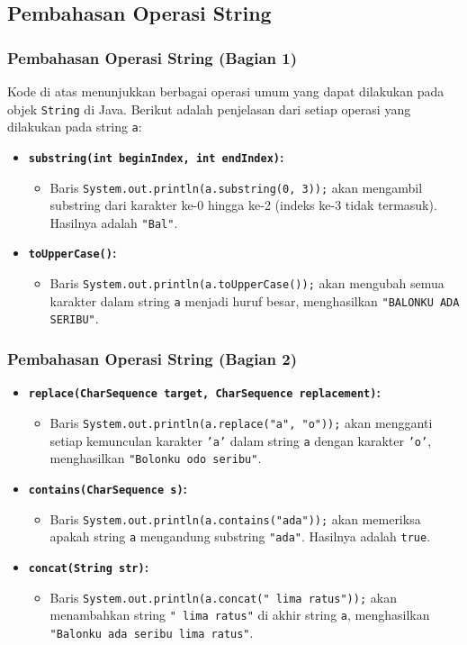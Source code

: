 \documentclass[aspectratio=169, table]{beamer}
\begin{document}
\subsection{Pembahasan Operasi String}
\begin{frame}
	\frametitle{Pembahasan Operasi String (Bagian 1)}
	Kode di atas menunjukkan berbagai operasi umum yang dapat dilakukan pada objek \texttt{String} di Java. Berikut adalah penjelasan dari setiap operasi yang dilakukan pada string \texttt{a}:
	\begin{itemize}
		\item \textbf{\texttt{substring(int beginIndex, int endIndex)}:} 
		\begin{itemize}
			\item Baris \texttt{System.out.println(a.substring(0, 3));} akan mengambil substring dari karakter ke-0 hingga ke-2 (indeks ke-3 tidak termasuk). Hasilnya adalah \texttt{"Bal"}.
		\end{itemize}
		
		\item \textbf{\texttt{toUpperCase()}:}
		\begin{itemize}
			\item Baris \texttt{System.out.println(a.toUpperCase());} akan mengubah semua karakter dalam string \texttt{a} menjadi huruf besar, menghasilkan \texttt{"BALONKU ADA SERIBU"}.
		\end{itemize}
	\end{itemize}
\end{frame}

\begin{frame}
	\frametitle{Pembahasan Operasi String (Bagian 2)}
	\begin{itemize}
		\item \textbf{\texttt{replace(CharSequence target, CharSequence replacement)}:}
		\begin{itemize}
			\item Baris \texttt{System.out.println(a.replace("a", "o"));} akan mengganti setiap kemunculan karakter \texttt{'a'} dalam string \texttt{a} dengan karakter \texttt{'o'}, menghasilkan \texttt{"Bolonku odo seribu"}.
		\end{itemize}
		
		\item \textbf{\texttt{contains(CharSequence s)}:}
		\begin{itemize}
			\item Baris \texttt{System.out.println(a.contains("ada"));} akan memeriksa apakah string \texttt{a} mengandung substring \texttt{"ada"}. Hasilnya adalah \texttt{true}.
		\end{itemize}
		
		\item \textbf{\texttt{concat(String str)}:}
		\begin{itemize}
			\item Baris \texttt{System.out.println(a.concat(" lima ratus"));} akan menambahkan string \texttt{" lima ratus"} di akhir string \texttt{a}, menghasilkan \texttt{"Balonku ada seribu lima ratus"}.
		\end{itemize}
	\end{itemize}
\end{frame}
\end{document}
